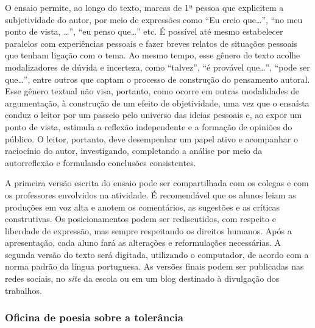 \documentclass[12pt]{extarticle}
\begin{document}
O ensaio permite, ao longo do texto, marcas de 1ª pessoa que explicitem
a subjetividade do autor, por meio de expressões como ``Eu creio
que\ldots{}'', ``no meu ponto de vista, \ldots{}'', ``eu penso que\ldots{}'' etc. É
possível até mesmo estabelecer paralelos com experiências pessoais e
fazer breves relatos de situações pessoais que tenham ligação com o
tema. Ao mesmo tempo, esse gênero de texto acolhe modalizadores de
dúvida e incerteza, como ``talvez'', ``é provável que\ldots{}'', ``pode ser
que\ldots{}'', entre outros que captam o processo de construção do pensamento
autoral. Esse gênero textual não visa, portanto, como ocorre em outras
modalidades de argumentação, à construção de um efeito de objetividade,
uma vez que o ensaísta conduz o leitor por um passeio pelo universo das
ideias pessoais e, ao expor um ponto de vista, estimula a reflexão
independente e a formação de opiniões do público. O leitor, portanto,
deve desempenhar um papel ativo e acompanhar o raciocínio do autor,
investigando, completando a análise por meio da autorreflexão e
formulando conclusões consistentes.

A primeira versão escrita do ensaio pode ser compartilhada com os
colegas e com os professores envolvidos na atividade. É recomendável que
os alunos leiam as produções em voz alta e anotem os comentários, as
sugestões e as críticas construtivas. Os posicionamentos podem ser
rediscutidos, com respeito e liberdade de expressão, mas sempre
respeitando os direitos humanos. Após a apresentação, cada aluno fará as
alterações e reformulações necessárias. A segunda versão do texto será
digitada, utilizando o computador, de acordo com a norma padrão da
língua portuguesa. As versões finais podem ser publicadas nas redes
sociais, no \emph{site} da escola ou em um blog destinado à divulgação
dos trabalhos.

\subsubsection{Oficina de poesia sobre a tolerância}
\end{document}
